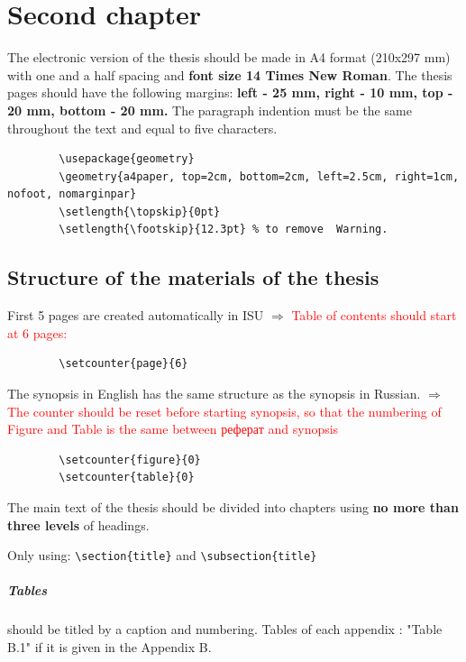 \chapter{Second chapter}
\label{ch:ch2}
The electronic version of the thesis should be made in A4 format (210x297 mm) with one and a half spacing and \textbf{font size 14 Times New Roman}.
The thesis pages should have the following margins: \textbf{left - 25 mm, right - 10 mm, top - 20 mm, bottom - 20 mm.} The paragraph indention must be the same throughout the text and equal to five characters.
{	\color{blue}
	\begin{verbatim}
		\usepackage{geometry}
		\geometry{a4paper, top=2cm, bottom=2cm, left=2.5cm, right=1cm, nofoot, nomarginpar}
		\setlength{\topskip}{0pt}
		\setlength{\footskip}{12.3pt} % to remove  Warning.
	\end{verbatim}
}
\section{Structure of the materials of the thesis}\label{sec:ch2/sec1}

First 5 pages are created automatically in ISU $\Rightarrow$ \textcolor{red}{Table of contents should start at 6 pages:}
{	\color{blue}
	\begin{verbatim}
		\setcounter{page}{6}
	\end{verbatim}
}

The synopsis in English has the same structure as the synopsis in Russian.
$\Rightarrow$ \textcolor{red}{The counter should be reset before starting synopsis, so that the numbering of Figure and Table is the same  between реферат and synopsis}
{	\color{blue}
	\begin{verbatim}
		\setcounter{figure}{0}
		\setcounter{table}{0}
	\end{verbatim}
}
The main text of the thesis should be divided into chapters using \textbf{no more than three levels} of headings. 

Only using: \verb*|\section{title}| and \verb*|\subsection{title}|
\paragraph*{Tables} should be titled by a caption and numbering.
Tables of each appendix : "Table B.1" if it is given in the Appendix B. 

